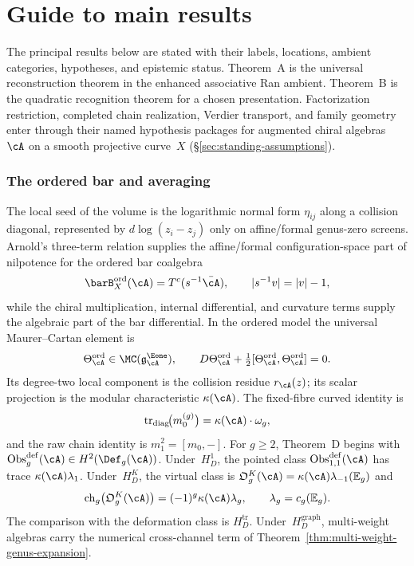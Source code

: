 
\chapter*{Guide to main results}
\label{ch:guide}%

\noindent
The principal results below are stated with their labels, locations,
ambient categories, hypotheses, and epistemic status.  Theorem~A is
the universal reconstruction theorem in the enhanced associative Ran
ambient.  Theorem~B is the quadratic recognition theorem for a chosen
presentation.  Factorization restriction, completed chain
realization, Verdier transport, and family geometry enter through
their named hypothesis packages for augmented chiral algebras~$\cA$
on a smooth projective curve~$X$
(\S\ref{sec:standing-assumptions}).

\medskip

\subsection*{The ordered bar and averaging}
\label{subsec:guide-ordered-bar-record}

The local seed of the volume is the logarithmic normal form
\(\eta_{ij}\) along a collision diagonal, represented by
\(d\log(z_i-z_j)\) only on affine/formal genus-zero screens. Arnold's
three-term relation supplies the affine/formal configuration-space part of
nilpotence for the ordered bar coalgebra
\[
 \barB^{\mathrm{ord}}_X(\cA)=T^c(s^{-1}\bar\cA),
 \qquad |s^{-1}v|=|v|-1,
\]
while the chiral multiplication, internal differential, and curvature
terms supply the algebraic part of the bar differential. In the ordered
model the universal Maurer--Cartan element is
\[
 \Theta_\cA^{\mathrm{ord}}\in \MC(\mathfrak g_{\cA}^{\Eone}),
 \qquad
 D\Theta_\cA^{\mathrm{ord}}
 +\tfrac12[\Theta_\cA^{\mathrm{ord}},\Theta_\cA^{\mathrm{ord}}]=0.
\]
Its degree-two local component is the collision residue
$r_\cA(z)$; its scalar projection is the modular characteristic
$\kappa(\cA)$.  The fixed-fibre curved identity is
\[
 \operatorname{tr}_{\mathrm{diag}}\!\bigl(m_0^{(g)}\bigr)
 =\kappa(\cA)\cdot\omega_g,
\]
and the raw chain identity is $m_1^2=[m_0,-]$.  For $g\geq2$,
Theorem~D begins with
$\operatorname{Obs}^{\mathrm{def}}_g(\cA)\in H^2(\Def_g(\cA))$.
Under~$H_D^1$, the pointed class
$\operatorname{Obs}^{\mathrm{def}}_{1,1}(\cA)$ has trace
$\kappa(\cA)\lambda_1$.  Under~$H_D^K$, the virtual class is
$\mathfrak O_g^K(\cA)=\kappa(\cA)\lambda_{-1}(\mathbb E_g)$ and
\[
 \operatorname{ch}_g\!\left(\mathfrak O_g^K(\cA)\right)
 =(-1)^g\kappa(\cA)\lambda_g,
 \qquad \lambda_g=c_g(\mathbb E_g).
\]
The comparison with the deformation class is $H_D^{\mathrm{tr}}$.
Under~$H_D^{\mathrm{graph}}$, multi-weight algebras carry the
numerical cross-channel term of
Theorem~\ref{thm:multi-weight-genus-expansion}.


